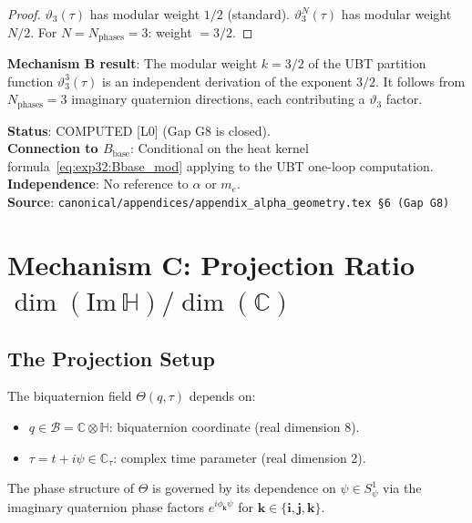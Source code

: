 \documentclass[12pt,a4paper]{article}
\theoremstyle{definition}
\theoremstyle{remark}
\begin{document}
\begin{proof}
$\vartheta_3(\tau)$ has modular weight $1/2$ (standard).
$\vartheta_3^N(\tau)$ has modular weight $N/2$.
For $N = N_{\mathrm{phases}} = 3$: weight $= 3/2$.
\end{proof}

\begin{resultbox}
\textbf{Mechanism B result}: The modular weight $k = 3/2$ of the UBT partition
function $\vartheta_3^3(\tau)$ is an independent derivation of the exponent $3/2$.
It follows from $N_{\mathrm{phases}} = 3$ imaginary quaternion directions, each
contributing a $\vartheta_3$ factor.

\medskip
\textbf{Status}: COMPUTED [L0] (Gap G8 is closed).\\
\textbf{Connection to $B_{\mathrm{base}}$}: Conditional on the heat kernel
formula~\eqref{eq:exp32:Bbase_mod} applying to the UBT one-loop computation.\\
\textbf{Independence}: No reference to $\alpha$ or $m_e$.\\
\textbf{Source}: \texttt{canonical/appendices/appendix\_alpha\_geometry.tex \S6 (Gap G8)}
\end{resultbox}

\section{Mechanism C: Projection Ratio $\dim(\mathrm{Im}\,\mathbb{H})/\dim(\mathbb{C})$}
\label{sec:exp32:projection}

\subsection{The Projection Setup}
\label{ssec:exp32:proj:setup}

The biquaternion field $\Theta(q, \tau)$ depends on:
\begin{itemize}
  \item $q \in \mathcal{B} = \mathbb{C}\otimes\mathbb{H}$: biquaternion coordinate
    (real dimension 8).
  \item $\tau = t + i\psi \in \mathbb{C}_\tau$: complex time parameter
    (real dimension 2).
\end{itemize}
The phase structure of $\Theta$ is governed by its dependence on
$\psi \in S^1_\psi$ via the imaginary quaternion phase factors
$e^{i\phi_\mathbf{k} \psi}$ for $\mathbf{k} \in \{\mathbf{i}, \mathbf{j}, \mathbf{k}\}$.
\end{document}
